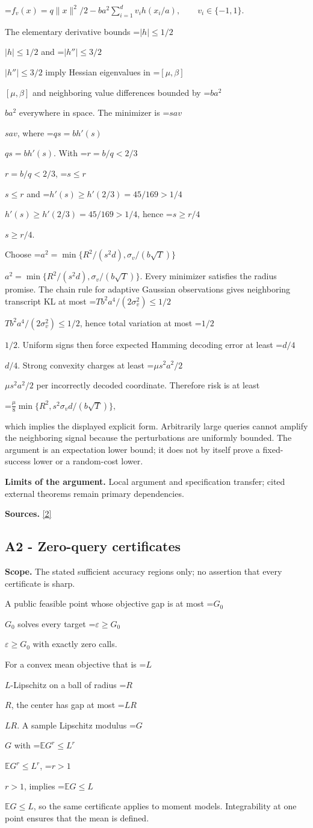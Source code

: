 \documentclass[10pt,a4paper]{article}
\newcommand{\AtlasMath}[1]{\par\begingroup\centering\setbox0=\hbox{$\displaystyle #1$}\ifdim\wd0>1.4\linewidth\typeout{ATLAS WIDE FORMULA: \the\wd0}\fi\ifdim\wd0>\linewidth\resizebox{\linewidth}{!}{\box0}\else\box0\fi\par\endgroup}
\newcommand{\AtlasInlineMath}[1]{\begingroup\setbox0=\hbox{$#1$}\ifdim\wd0>.4\linewidth\endgroup\AtlasMath{#1}\else\endgroup$#1$\fi}
\begin{document}
\AtlasMath{f_v(x)=q\|x\|^2/2-ba^2\sum_{i=1}^d v_i h(x_i/a),\qquad v_i\in\{-1,1\}.}

The elementary derivative bounds \AtlasInlineMath{|h|\le1/2} and \AtlasInlineMath{|h''|\le3/2} imply Hessian eigenvalues in \AtlasInlineMath{[\mu,\beta]} and neighboring value differences bounded by \AtlasInlineMath{ba^2} everywhere in space. The minimizer is \AtlasInlineMath{sav}, where \AtlasInlineMath{qs=bh'(s)}. With \AtlasInlineMath{r=b/q<2/3}, \AtlasInlineMath{s\le r} and \AtlasInlineMath{h'(s)\ge h'(2/3)=45/169>1/4}, hence \AtlasInlineMath{s\ge r/4}.

Choose \AtlasInlineMath{a^2=\min\{R^2/(s^2d),\sigma_v/(b\sqrt T)\}}. Every minimizer satisfies the radius promise. The chain rule for adaptive Gaussian observations gives neighboring transcript KL at most \AtlasInlineMath{Tb^2a^4/(2\sigma_v^2)\le1/2}, hence total variation at most \AtlasInlineMath{1/2}. Uniform signs then force expected Hamming decoding error at least \AtlasInlineMath{d/4}. Strong convexity charges at least \AtlasInlineMath{\mu s^2a^2/2} per incorrectly decoded coordinate. Therefore risk is at least

\AtlasMath{\frac\mu8\min\{R^2,s^2\sigma_vd/(b\sqrt T)\},}

which implies the displayed explicit form. Arbitrarily large queries cannot amplify the neighboring signal because the perturbations are uniformly bounded. The argument is an expectation lower bound; it does not by itself prove a fixed-success lower or a random-cost lower.

\textbf{Limits of the argument.} Local argument and specification transfer; cited external theorems remain primary dependencies.

\textbf{Sources.} \href{https://proceedings.mlr.press/v30/Shamir13.html}{[2]}

\subsection{A2 - Zero-query certificates}
\textbf{Scope.} The stated sufficient accuracy regions only; no assertion that every certificate is sharp.

A public feasible point whose objective gap is at most \AtlasInlineMath{G_0} solves every target \AtlasInlineMath{\varepsilon\ge G_0} with exactly zero calls.

For a convex mean objective that is \AtlasInlineMath{L}-Lipschitz on a ball of radius \AtlasInlineMath{R}, the center has gap at most \AtlasInlineMath{LR}. A sample Lipschitz modulus \AtlasInlineMath{G} with \AtlasInlineMath{\mathbb E G^r\le L^r}, \AtlasInlineMath{r>1}, implies \AtlasInlineMath{\mathbb E G\le L}, so the same certificate applies to moment models. Integrability at one point ensures that the mean is defined.
\end{document}
